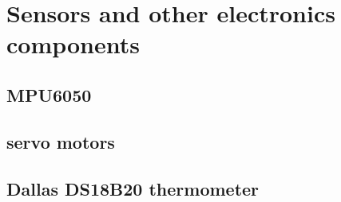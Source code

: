 \section{Sensors and other electronics components}

\subsection{MPU6050}

\subsection{servo motors}

\subsection{Dallas DS18B20 thermometer}
